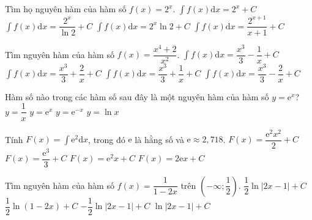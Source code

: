 \begin{ex}
	Tìm họ nguyên hàm của hàm số $ f(x)=2^x$.
	\choice
	{$\displaystyle\int{f(x)}\mathrm{d}x=2^x+C$}
	{\True $\displaystyle\int{f(x)}\mathrm{d}x=\dfrac{2^x}{\ln 2}+C$}
	{$\displaystyle\int{f(x)}\mathrm{d}x=2^x\ln 2+C$}
	{$\displaystyle\int{f(x)}\mathrm{d}x=\dfrac{2^{x+1}}{x+1}+C$}
\end{ex}
\begin{ex}
	Tìm nguyên hàm của hàm số $ f(x)=\dfrac{x^4+2}{x^2}$.
	\choice
	{$\displaystyle\int{f(x)\mathrm{d}x=}\dfrac{x^3}{3}-\dfrac{1}{x}+C$}
	{$\displaystyle\int{f(x)\mathrm{d}x=}\dfrac{x^3}{3}+\dfrac{2}{x}+C$}
	{$\displaystyle\int{f(x)\mathrm{d}x=}\dfrac{x^3}{3}+\dfrac{1}{x}+C$}
	{\True $\displaystyle\int{f(x)\mathrm{d}x=}\dfrac{x^3}{3}-\dfrac{2}{x}+C$}
\end{ex}
\begin{ex}
	[Sở Hà Nội 2019]%
	Hàm số nào trong các hàm số sau đây là một nguyên hàm của hàm số $ y=\mathrm{e}^x$?
	\choice
	{$ y=\dfrac{1}{x}$}
	{\True $ y=\mathrm{e}^x$}
	{$ y=\mathrm{e}^{-x}$}
	{$ y=\ln x$}
\end{ex}
\begin{ex}
	Tính $ F(x)=\displaystyle\int{\mathrm{e}^2}\mathrm{d}x$, trong đó $ \mathrm{e}$ là hằng số và $ \mathrm{e}\approx 2,718$.
	\choice
	{$ F(x)=\dfrac{\mathrm{e}^2x^2}{2}+C$}
	{$ F(x)=\dfrac{\mathrm{e}^3}{3}+C$}
	{\True $ F(x)=\mathrm{e}^2x+C$}
	{$F(x)=2\mathrm{e}x+C$}
\end{ex}
\begin{ex}
	Tìm nguyên hàm của hàm số $ f(x)=\dfrac{1}{1-2x}$ trên $\left(-\infty;\dfrac{1}{2}\right)$.
	\choice
	{$\dfrac{1}{2}\ln\left| 2x-1\right|+C$}
	{$\dfrac{1}{2}\ln\left(1-2x\right)+C$}
	{\True $-\dfrac{1}{2}\ln\left| 2x-1\right|+C$}
	{$\ln\left| 2x-1\right|+C$}
\end{ex}
